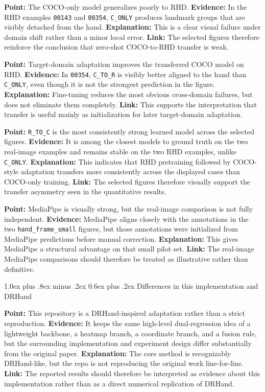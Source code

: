\documentclass[10pt,letterpaper]{article}
\makeatletter
\renewcommand\subsection{\@startsection{subsection}{2}{\z@}%
  {1.0ex plus .8ex minus .2ex}%
  {0.6ex plus .2ex}%
  {\normalfont\itshape}}
\makeatother
\begin{document}
\medskip
\noindent\textbf{Point:} The COCO-only model generalizes poorly to RHD.  
\textbf{Evidence:} In the RHD examples \texttt{00143} and \texttt{00354}, \texttt{C\_ONLY} produces landmark groups that are visibly detached from the hand.  
\textbf{Explanation:} This is a clear visual failure under domain shift rather than a minor local error.  
\textbf{Link:} The selected figures therefore reinforce the conclusion that zero-shot COCO-to-RHD transfer is weak.

\medskip
\noindent\textbf{Point:} Target-domain adaptation improves the transferred COCO model on RHD.  
\textbf{Evidence:} In \texttt{00354}, \texttt{C\_TO\_R} is visibly better aligned to the hand than \texttt{C\_ONLY}, even though it is not the strongest prediction in the figure.  
\textbf{Explanation:} Fine-tuning reduces the most obvious cross-domain failures, but does not eliminate them completely.  
\textbf{Link:} This supports the interpretation that transfer is useful mainly as initialization for later target-domain adaptation.

\medskip
\noindent\textbf{Point:} \texttt{R\_TO\_C} is the most consistently strong learned model across the selected figures.  
\textbf{Evidence:} It is among the closest models to ground truth on the two real-image examples and remains stable on the two RHD examples, unlike \texttt{C\_ONLY}.  
\textbf{Explanation:} This indicates that RHD pretraining followed by COCO-style adaptation transfers more consistently across the displayed cases than COCO-only training.  
\textbf{Link:} The selected figures therefore visually support the transfer asymmetry seen in the quantitative results.

\medskip
\noindent\textbf{Point:} MediaPipe is visually strong, but the real-image comparison is not fully independent.  
\textbf{Evidence:} MediaPipe aligns closely with the annotations in the two \texttt{hand\_frame\_small} figures, but those annotations were initialized from MediaPipe predictions before manual correction.  
\textbf{Explanation:} This gives MediaPipe a structural advantage on that small pilot set.  
\textbf{Link:} The real-image MediaPipe comparisons should therefore be treated as illustrative rather than definitive.

\subsection{Differences in this implementation and DRHand}

\noindent\textbf{Point:} This repository is a DRHand-inspired adaptation rather than a strict reproduction.
\textbf{Evidence:} It keeps the same high-level dual-regression idea of a lightweight backbone, a heatmap branch, a coordinate branch, and a fusion rule, but the surrounding implementation and experiment design differ substantially from the original paper.
\textbf{Explanation:} The core method is recognizably DRHand-like, but the repo is not reproducing the original work line-for-line.
\textbf{Link:} The reported results should therefore be interpreted as evidence about this implementation rather than as a direct numerical replication of DRHand.
\end{document}
